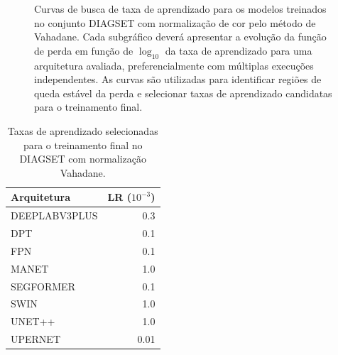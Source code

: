 \begin{figure}[!htb]
\centering


\caption[Curvas de busca de taxa de aprendizado para DIAGSET com Vahadane]{
Curvas de busca de taxa de aprendizado para os modelos treinados no conjunto
DIAGSET com normalização de cor pelo método de Vahadane. Cada subgráfico deverá
apresentar a evolução da função de perda em função de $\log_{10}$ da taxa de
aprendizado para uma arquitetura avaliada, preferencialmente com múltiplas
execuções independentes. As curvas são utilizadas para identificar regiões de
queda estável da perda e selecionar taxas de aprendizado candidatas para o
treinamento final.
}
\label{fig:results_diagset-lr-curves-vahadane}
\end{figure}

\begin{table}[!htb]
\centering
\caption{Taxas de aprendizado selecionadas para o treinamento final no DIAGSET com normalização Vahadane.}
\label{tab:results_diagset-learning-rates-vahadane}
\begin{tabular}{lr}
\toprule
Arquitetura & LR ($10^{-3}$) \\
\midrule
DEEPLABV3PLUS & 0.3 \\
DPT & 0.1 \\
FPN & 0.1 \\
MANET & 1.0 \\
SEGFORMER & 0.1 \\
SWIN & 1.0 \\
UNET++ & 1.0 \\
UPERNET & 0.01 \\
\bottomrule
\end{tabular}
\end{table}
